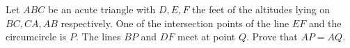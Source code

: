 Let $ABC$ be an acute triangle with $D, E, F$ the feet of the altitudes lying on $BC, CA, AB$ respectively. One of the intersection points of the line $EF$ and the circumcircle is $P.$ The lines $BP$ and $DF$ meet at point $Q.$ Prove that $AP = AQ.$